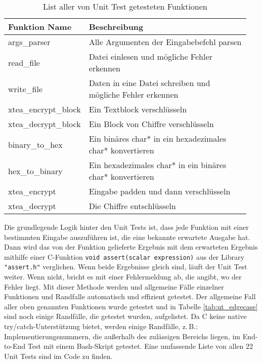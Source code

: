 \documentclass[course=erap]{aspdoc}
\begin{document}
\begin{table}[h]
    \centering
    \footnotesize 
    \begin{tabular}{p{0.23\linewidth}p{0.72\linewidth}}
    \toprule[2pt]
        Funktion Name & Beschreibung\\
        \midrule
         args\_parser &  Alle Argumenten der Eingabebefehl parsen \\
         read\_file & Datei einlesen und mögliche Fehler erkennen\\
         write\_file & Daten in eine Datei schreiben und mögliche Fehler erkennen\\
         xtea\_encrypt\_block & Ein Textblock verschlüsseln\\
         xtea\_decrypt\_block & Ein Block von Chiffre verschlüsseln\\
         binary\_to\_hex & Ein binäres char* in ein hexadezimales char* konvertieren\\
         hex\_to\_binary & Ein hexadezimales char* in ein binäres char* konvertieren\\
         xtea\_encrypt & Eingabe padden und dann verschlüsseln\\
         xtea\_decrypt & Die Chiffre entschlüsseln\\
    \bottomrule[2pt]
    \end{tabular}
    \caption{List aller von Unit Test getesteten Funktionen}
    \label{tab:ut_funcs}
\end{table}


Die grundlegende Logik hinter den Unit Tests ist, dass jede Funktion mit einer bestimmten Eingabe auszuführen ist, die eine bekannte erwartete Ausgabe hat. Dann wird das von der Funktion gelieferte Ergebnis mit dem erwarteten Ergebnis mithilfe einer C-Funktion \lstinline{void assert(scalar expression)} aus der Library \lstinline{"assert.h"} verglichen. Wenn beide Ergebnisse gleich sind, läuft der Unit Test weiter. Wenn nicht, bricht es mit einer Fehlermeldung ab, die angibt, wo der Fehler liegt. Mit dieser Methode werden und allgemeine Fälle einzelner Funktionen und Randfalle automatisch und effizient getestet. Der allgemeine Fall aller oben genannten Funktionen wurde getestet und in Tabelle \ref{tab:ut_edgecase} sind noch einige Randfälle, die getestet wurden, aufgelistet. Da C keine native try/catch-Unterstützung bietet, werden einige Randfälle, z.\,B.: Implementierungsnummern, die außerhalb des zulässigen Bereichs liegen, im End-to-End Test mit einem Bash-Skript getestet. Eine umfassende Liste von allen 22 Unit Tests sind im Code zu finden. 
\end{document}
